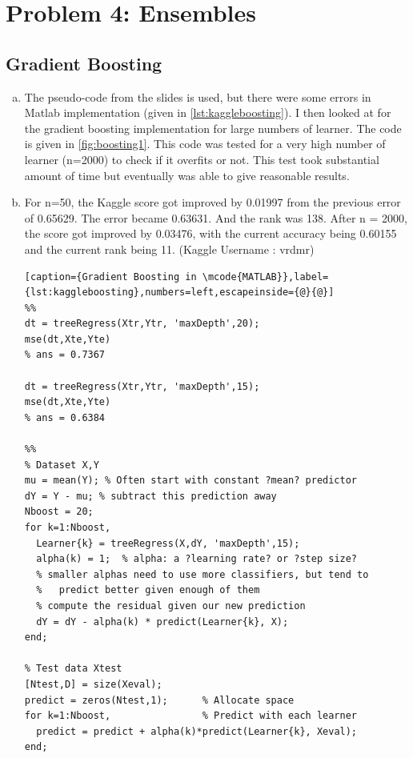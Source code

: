 \documentclass[a4paper, 11pt]{article}
\begin{document}
\pagebreak
\section*{Problem 4: Ensembles}
\subsection*{Gradient Boosting}
\begin{enumerate}[(a)]
\item The pseudo-code from the slides is used, but there were some errors in Matlab implementation (given in \autoref{lst:kaggleboosting}). I then looked at  for the gradient boosting implementation for large numbers of learner. The code is given in \autoref{fig:boosting1}. This code was tested for a very high number of learner (n=2000) to check if it overfits or not. This test took substantial amount of time but eventually was able to give reasonable results.

\item For n=50, the Kaggle score got improved by 0.01997 from the previous error of 0.65629. The error became 0.63631. And the rank was 138. After n = 2000, the score got improved by  0.03476, with the current accuracy being 0.60155 and the current rank being 11. (Kaggle Username : vrdmr)

\vspace{-15pt}
\begin{lstlisting}[caption={Gradient Boosting in \mcode{MATLAB}},label={lst:kaggleboosting},numbers=left,escapeinside={@}{@}]
%%
dt = treeRegress(Xtr,Ytr, 'maxDepth',20);
mse(dt,Xte,Yte) 
% ans = 0.7367

dt = treeRegress(Xtr,Ytr, 'maxDepth',15);
mse(dt,Xte,Yte)
% ans = 0.6384

%%
% Dataset X,Y
mu = mean(Y); % Often start with constant ?mean? predictor 
dY = Y - mu; % subtract this prediction away
Nboost = 20;
for k=1:Nboost,
  Learner{k} = treeRegress(X,dY, 'maxDepth',15);
  alpha(k) = 1;  % alpha: a ?learning rate? or ?step size?
  % smaller alphas need to use more classifiers, but tend to
  %   predict better given enough of them
  % compute the residual given our new prediction
  dY = dY - alpha(k) * predict(Learner{k}, X);
end;

% Test data Xtest
[Ntest,D] = size(Xeval);
predict = zeros(Ntest,1);      % Allocate space
for k=1:Nboost,                % Predict with each learner
  predict = predict + alpha(k)*predict(Learner{k}, Xeval);
end;
\end{lstlisting}



\end{enumerate}
\end{document}
